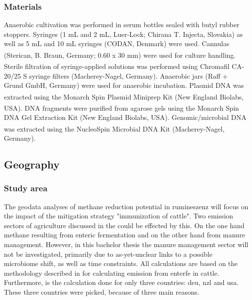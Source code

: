 \subsubsection{Materials}
\label{sec:materials}
Anaerobic cultivation was performed in serum bottles sealed with butyl rubber stoppers. Syringes (1 mL and 2 mL, Luer-Lock; Chirana T. Injecta, Slovakia) as well as 5 mL and 10 mL syringes (CODAN, Denmark) were used. Cannulas  (Sterican\textsuperscript{\textregistered}, B. Braun, Germany; 0.60 x 30 mm) were used for culture handling. Sterile filtration of syringe-applied solutions was performed using Chromafil\textsuperscript{\textregistered} CA-20/25 S syringe filters (Macherey-Nagel, Germany). Anaerobic jars (Raff + Grund GmbH, Germany) were used for anaerobic incubation. Plasmid DNA was extracted using the Monarch\textsuperscript{\textregistered} Spin Plasmid Miniprep Kit (New England Biolabs, USA). DNA fragments were purified from agarose gels using the Monarch\textsuperscript{\textregistered} Spin DNA Gel Extraction Kit (New England Biolabs, USA). Genomic/microbial DNA was extracted using the NucleoSpin\textsuperscript{\textregistered} Microbial DNA Kit (Macherey-Nagel, Germany).





\subsection{Geography} %
\label{sec:data_and_material_geo}

\subsubsection{Study area}
\label{sec:study_area}

The geodata analyses of methane reduction potential in rumineszenz will focus on the impact of the mitigation strategy "immunization of cattle". Two emission sectors of agriculture discussed in the \citet{IPCC_2019_Chapter_EnterFE} could be effected by this. On the one hand methane resulting from enteric fermentation and on the other hand from manure management. However, in this bachelor thesis the manure management sector will not be investigated, primarily due to as-yet-unclear links to a possible microbiome shift, as well as time constraints.
All calculations are based on the methodology described in \citet{IPCC_2019_Chapter_EnterFE} for calculating  emission from \acrlong{enterfe} in cattle.
Furthermore, is the calculation done for only three countries: \acrshort{deu}, \acrshort{nzl} and \acrshort{usa}. These three countries were picked, because of three main reasons.

